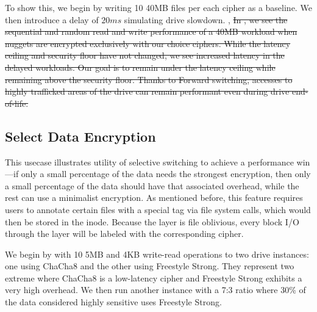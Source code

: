 

To show this, we begin by writing 10 40MB files per each cipher as a baseline.
 We then introduce a delay of $20ms$
simulating drive slowdown. ,
\sout{In , we see the sequential and random read
and write performance of a 40MB workload when nuggets are encrypted exclusively
with our choice ciphers. While the latency ceiling and security floor have not
changed, we see increased latency in the delayed workloads. Our goal is to
remain under the latency ceiling while remaining above the security floor.
Thanks to Forward switching, accesses to highly trafficked areas of the drive
can remain performant even during drive end-of-life.}


\subsection{Select Data Encryption}\label{subsec:uc2}

This usecase illustrates utility of selective switching to achieve a performance
win---if only a small percentage of the data needs the strongest encryption,
then only a small percentage of the data should have that associated overhead,
while the rest can use a minimalist encryption. As mentioned before, this
feature requires users to annotate certain files with a special tag via file
system calls, which would then be stored in the inode.  Because the \sys layer
is file oblivious, every block I/O through the \sys layer will be labeled with
the corresponding cipher.

We begin by with 10 5MB and 4KB write-read operations to two \sys drive
instances: one using ChaCha8 and the other using Freestyle Strong.  They
represent two extreme where ChaCha8 is a low-latency cipher and Freestyle Strong
exhibits a very high overhead.  We then run another \sys instance with a 7:3
ratio where 30\% of the data considered highly sensitive uses Freestyle Strong.

